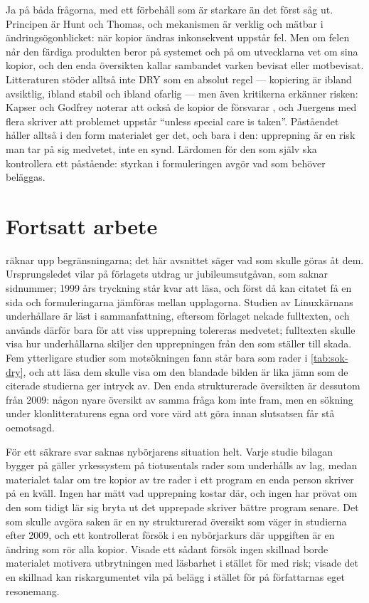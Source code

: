 Ja på båda frågorna, med ett förbehåll som är starkare än det först
såg ut.  Principen är Hunt och Thomas, och mekanismen är verklig och
mätbar i ändringsögonblicket: när kopior ändras inkonsekvent uppstår
fel.  Men om felen når den färdiga produkten beror på systemet och på om
utvecklarna vet om sina kopior, och den enda översikten kallar sambandet
varken bevisat eller motbevisat.  Litteraturen stöder alltså inte DRY
som en absolut regel --- kopiering är ibland avsiktlig, ibland stabil och
ibland ofarlig --- men även kritikerna erkänner risken: Kapser och
Godfrey noterar att också de kopior de försvarar
, och Juergens med flera skriver att problemet
uppstår \enquote{unless special care is taken}.  Påståendet håller
alltså i den form materialet ger det, och bara i den: upprepning är en
risk man tar på sig medvetet, inte en synd.  Lärdomen för den som själv
ska kontrollera ett påstående: styrkan i formuleringen avgör vad som
behöver beläggas.

\section{Fortsatt arbete}
\label{sec:dry-fortsatt}

 räknar upp begränsningarna; det här avsnittet
säger vad som skulle göras åt dem.  Ursprungsledet vilar på förlagets
utdrag ur jubileumsutgåvan\autocite{ThomasHunt2019}, som saknar
sidnummer; 1999 års tryckning\autocite{HuntThomas1999} står kvar att
läsa, och först då kan citatet få en sida och formuleringarna jämföras
mellan upplagorna.  Studien av Linuxkärnans
underhållare\autocite{Arcanjo2026DRY} är läst i sammanfattning, eftersom
förlaget nekade fulltexten, och används därför bara för att viss
upprepning tolereras medvetet; fulltexten skulle visa hur underhållarna
skiljer den upprepningen från den som ställer till skada.  Fem
ytterligare studier som motsökningen fann står bara som rader i
\cref{tab:sok-dry}, och att läsa dem skulle visa om den blandade bilden
är lika jämn som de citerade studierna ger intryck av.  Den enda
strukturerade översikten\autocite{Hordijk2009Review} är dessutom från
2009: någon nyare översikt av samma fråga kom inte fram, men en sökning
under klonlitteraturens egna ord vore värd att göra innan slutsatsen
får stå oemotsagd.

För ett säkrare svar saknas nybörjarens situation helt.  Varje studie
bilagan bygger på gäller yrkessystem på tiotusentals rader som
underhålls av lag, medan materialet talar om tre kopior av tre rader i
ett program en enda person skriver på en kväll.  Ingen har mätt vad
upprepning kostar där, och ingen har prövat om den som tidigt lär sig
bryta ut det upprepade skriver bättre program senare.  Det som skulle
avgöra saken är en ny strukturerad översikt som väger in studierna efter
2009, och ett kontrollerat försök i en nybörjarkurs där uppgiften är en
ändring som rör alla kopior.  Visade ett sådant försök ingen skillnad
borde materialet motivera utbrytningen med läsbarhet i stället för med
risk; visade det en skillnad kan riskargumentet vila på belägg i stället
för på författarnas eget resonemang.

